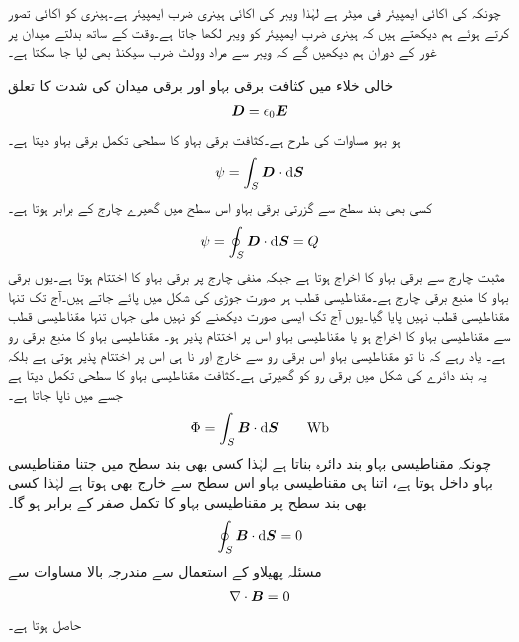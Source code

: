 چونکہ  کی اکائی ایمپیئر فی میٹر ہے لہٰذا ویبر کی اکائی ہینری ضرب ایمپیئر ہے۔ہینری کو اکائی تصور کرتے ہوئے ہم دیکھتے ہیں کہ ہینری ضرب ایمپیئر کو ویبر لکھا جاتا ہے۔وقت کے ساتھ بدلتے میدان پر غور کے دوران ہم دیکھیں گے کہ ویبر سے مراد وولٹ ضرب سیکنڈ بھی لیا جا سکتا ہے۔ 

خالی خلاء میں کثافت برقی بہاو  اور برقی میدان کی شدت  کا تعلق
\begin{align*}
{\ensuremath{{\boldsymbol{D}}}}=\epsilon_0 {{\boldsymbol{E}}}
\end{align*}
ہو بہو مساوات  کی طرح ہے۔کثافت برقی بہاو کا سطحی تکمل برقی بہاو  دیتا ہے۔
\begin{align*}
\psi=\int_S \kvec{D} \cdot \dif \kvec{S}
\end{align*}
کسی بھی بند سطح سے گزرتی برقی بہاو اس سطح میں گھیرے چارج  کے برابر ہوتا ہے۔
\begin{align*}
\psi=\oint_S \kvec{D} \cdot \dif \kvec{S}=Q
\end{align*}
مثبت چارج سے برقی بہاو کا اخراج ہوتا ہے جبکہ منفی چارج پر برقی بہاو کا اختتام ہوتا ہے۔یوں برقی بہاو کا منبع برقی چارج ہے۔مقناطیسی قطب ہر صورت جوڑی کی شکل میں پائے جاتے ہیں۔آج تک تنہا مقناطیسی قطب نہیں پایا گیا۔یوں آج تک ایسی صورت دیکھنے کو نہیں ملی جہاں تنہا مقناطیسی قطب سے مقناطیسی بہاو کا اخراج ہو یا مقناطیسی بہاو اس پر اختتام پذیر ہو۔ مقناطیسی بہاو کا منبع برقی رو ہے۔ یاد رہے کہ نا تو مقناطیسی بہاو اس برقی رو سے خارج اور نا ہی اس پر اختتام پذیر ہوتی ہے بلکہ یہ بند دائرے کی شکل میں برقی رو کو گھیرتی ہے۔کثافت مقناطیسی بہاو کا سطحی تکمل   دیتا ہے جسے   میں ناپا جاتا ہے۔
\begin{align}
\Phi=\int_S \kvec{B} \cdot \dif \kvec{S} \quad \quad \si{\weber}
\end{align} 
چونکہ مقناطیسی بہاو بند دائرہ بناتا ہے لہٰذا کسی بھی بند سطح میں جتنا مقناطیسی بہاو داخل ہوتا ہے، اتنا ہی مقناطیسی بہاو اس سطح سے خارج بھی ہوتا ہے لہٰذا کسی بھی بند سطح پر مقناطیسی بہاو کا تکمل صفر کے برابر ہو گا۔
\begin{align}\label{مساوات_مقناطیسی_مقناطیسی_بہاو_بند_سطح}
\oint_S \kvec{B} \cdot \dif \kvec{S}=0
\end{align}
مسئلہ پھیلاو کے استعمال سے مندرجہ بالا مساوات سے
\begin{align}\label{مساوات_مقناطیسی_مقناطیسی_بہاو_پھیلاو}
\nabla \cdot {\ensuremath{{\boldsymbol{B}}}}=0
\end{align}
حاصل ہوتا ہے۔

